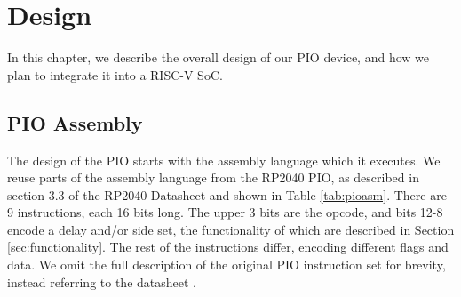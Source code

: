 \chapter{Design}
\label{ch:design}

In this chapter, we describe the overall design of our PIO device, and how we plan to integrate it into a RISC-V SoC.

\section{PIO Assembly}
\label{sec:pioasm}

The design of the PIO starts with the assembly language which it executes. We reuse parts of the assembly language from the RP2040 PIO, as described in section 3.3 of the RP2040 Datasheet and shown in Table \ref{tab:pioasm}. There are 9 instructions, each 16 bits long. The upper 3 bits are the opcode, and bits 12-8 encode a delay and/or side set, the functionality of which are described in Section \ref{sec:functionality}. The rest of the instructions differ, encoding different flags and data. We omit the full description of the original PIO instruction set for brevity, instead referring to the datasheet \cite{rp2040}.

